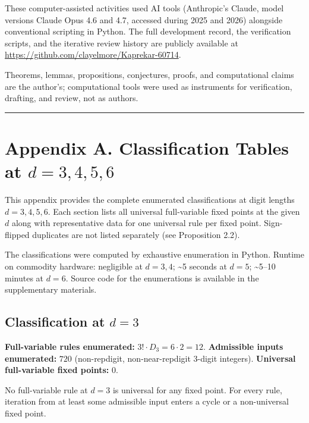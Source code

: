 \documentclass[11pt,letterpaper]{article}
\theoremstyle{paperstyle}
\theoremstyle{paperstyledef}
\theoremstyle{paperstylerem}
\begin{document}
These computer-assisted activities used AI tools (Anthropic's Claude,
model versions Claude Opus 4.6 and 4.7, accessed during 2025 and 2026)
alongside conventional scripting in Python. The full development record,
the verification scripts, and the iterative review history are publicly
available at \url{https://github.com/clayelmore/Kaprekar-60714}.

Theorems, lemmas, propositions, conjectures, proofs, and computational
claims are the author's; computational tools were used as instruments
for verification, drafting, and review, not as authors.

\begin{center}\rule{0.5\linewidth}{0.5pt}\end{center}

\hypertarget{appendix-a.-classification-tables-at-d-3-4-5-6}{%
\section{\texorpdfstring{Appendix A. Classification Tables at
\(d = 3, 4, 5, 6\)}{Appendix A. Classification Tables at d = 3, 4, 5, 6}}\label{appendix-a.-classification-tables-at-d-3-4-5-6}}

This appendix provides the complete enumerated classifications at digit
lengths \(d = 3, 4, 5, 6\). Each section lists all universal
full-variable fixed points at the given \(d\) along with representative
data for one universal rule per fixed point. Sign-flipped duplicates are
not listed separately (see Proposition 2.2).

The classifications were computed by exhaustive enumeration in Python.
Runtime on commodity hardware: negligible at \(d = 3, 4\);
\textasciitilde5 seconds at \(d = 5\); \textasciitilde5--10 minutes at
\(d = 6\). Source code for the enumerations is available in the
supplementary materials.

\hypertarget{a.1-classification-at-d-3}{%
\subsection{\texorpdfstring{Classification at \(d = 3\)}{Classification at d = 3}}\label{a.1-classification-at-d-3}}

\textbf{Full-variable rules enumerated:}
\(3! \cdot D_3 = 6 \cdot 2 = 12\). \textbf{Admissible inputs
enumerated:} \(720\) (non-repdigit, non-near-repdigit \(3\)-digit
integers). \textbf{Universal full-variable fixed points:} \(0\).

No full-variable rule at \(d = 3\) is universal for any fixed point. For
every rule, iteration from at least some admissible input enters a cycle
or a non-universal fixed point.
\end{document}
